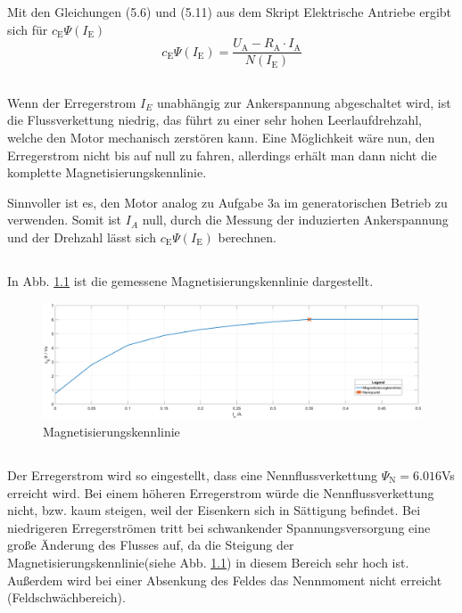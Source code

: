 \chapter{}\label{ex:aufg4}
%
\section{}\label{sec:aufg4a}
Mit den Gleichungen (5.6) und (5.11) aus dem Skript Elektrische Antriebe ergibt sich für $c_\text{E}\Psi(I_\text{E})$
\begin{equation}
c_\text{E}\Psi(I_\text{E}) = \frac{U_\text{A} - R_\text{A} \cdot I_\text{A}}{N(I_\text{E})}
\end{equation}
\section{}\label{sec:aufg4b}
Wenn der Erregerstrom $I_E$ unabhängig zur Ankerspannung abgeschaltet wird, ist die Flussverkettung niedrig, das führt zu einer sehr hohen Leerlaufdrehzahl, welche den Motor mechanisch zerstören kann. Eine Möglichkeit wäre nun, den Erregerstrom nicht bis auf null zu fahren, allerdings erhält man dann nicht die komplette Magnetisierungskennlinie.

Sinnvoller ist es, den Motor analog zu Aufgabe 3a im generatorischen Betrieb zu verwenden. Somit ist $I_A$ null, durch die Messung der induzierten Ankerspannung und der Drehzahl lässt sich $c_\text{E}\Psi(I_\text{E})$ berechnen.

\section{}\label{sec:aufg4c}
%
In Abb. \ref{fig:magnet} ist die gemessene Magnetisierungskennlinie dargestellt.
\begin{figure}[htb]

\includegraphics[width=1\textwidth]{./Bilder/magentisierungkennlinie_1}
\caption{Magnetisierungskennlinie}
\label{fig:magnet}
\end{figure}
%
\section{}\label{sec:aufg4_d}
%
Der Erregerstrom wird so eingestellt, dass eine Nennflussverkettung $\Psi_\text{N} = 6.016$Vs erreicht wird. Bei einem höheren Erregerstrom würde die Nennflussverkettung nicht, bzw. kaum steigen, weil der Eisenkern sich in Sättigung befindet. Bei niedrigeren Erregerströmen tritt bei schwankender Spannungsversorgung eine große Änderung des Flusses auf, da die Steigung der Magnetisierungskennlinie(siehe Abb. \ref{fig:magnet}) in diesem Bereich sehr hoch ist. Außerdem wird bei einer Absenkung des Feldes das Nennmoment nicht erreicht (Feldschwächbereich).
%
\clearpage